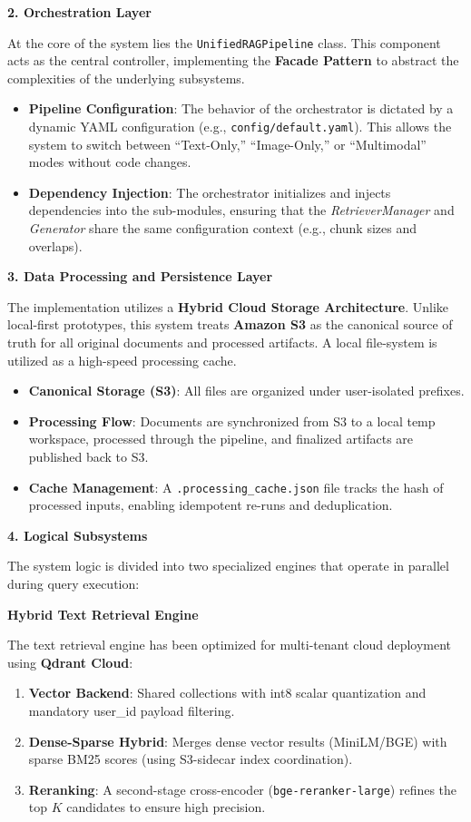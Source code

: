 \textbf{2. Orchestration Layer}

At the core of the system lies the \texttt{UnifiedRAGPipeline} class. This component acts as the central controller, implementing the \textbf{Facade Pattern} to abstract the complexities of the underlying subsystems.
\begin{itemize}
    \item \textbf{Pipeline Configuration}: The behavior of the orchestrator is dictated by a dynamic YAML configuration (e.g., \texttt{config/default.yaml}). This allows the system to switch between ``Text-Only,'' ``Image-Only,'' or ``Multimodal'' modes without code changes.
    \item \textbf{Dependency Injection}: The orchestrator initializes and injects dependencies into the sub-modules, ensuring that the \textit{RetrieverManager} and \textit{Generator} share the same configuration context (e.g., chunk sizes and overlaps).
\end{itemize}

\textbf{3. Data Processing and Persistence Layer}

The implementation utilizes a \textbf{Hybrid Cloud Storage Architecture}. Unlike local-first prototypes, this system treats \textbf{Amazon S3} as the canonical source of truth for all original documents and processed artifacts. A local file-system is utilized as a high-speed processing cache.

\begin{itemize}
    \item \textbf{Canonical Storage (S3)}: All files are organized under user-isolated prefixes.
    \item \textbf{Processing Flow}: Documents are synchronized from S3 to a local temp workspace, processed through the pipeline, and finalized artifacts are published back to S3.
    \item \textbf{Cache Management}: A \texttt{.processing\_cache.json} file tracks the hash of processed inputs, enabling idempotent re-runs and deduplication.
\end{itemize}

\textbf{4. Logical Subsystems}

The system logic is divided into two specialized engines that operate in parallel during query execution:

\textbf{Hybrid Text Retrieval Engine}

The text retrieval engine has been optimized for multi-tenant cloud deployment using \textbf{Qdrant Cloud}:
\begin{enumerate}
    \item \textbf{Vector Backend}: Shared collections with int8 scalar quantization and mandatory user\_id payload filtering.
    \item \textbf{Dense-Sparse Hybrid}: Merges dense vector results (MiniLM/BGE) with sparse BM25 scores (using S3-sidecar index coordination).
    \item \textbf{Reranking}: A second-stage cross-encoder (\texttt{bge-reranker-large}) refines the top $K$ candidates to ensure high precision.
\end{enumerate}

